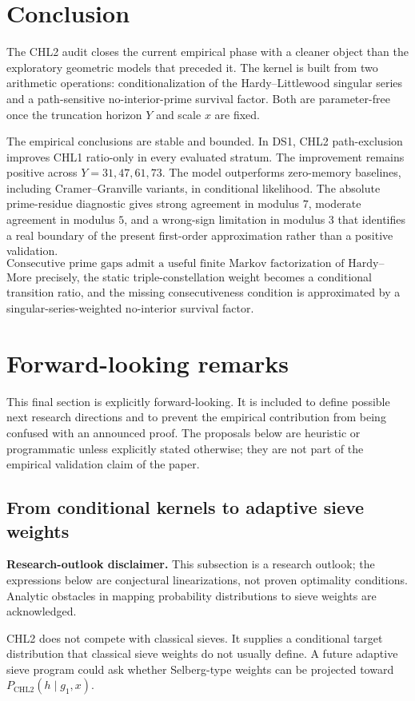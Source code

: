 \documentclass[10pt]{article}
\newcommand{\CHLtwo}{\mathrm{CHL2}}
\begin{document}
\section{Conclusion}
The CHL2 audit closes the current empirical phase with a cleaner object than the exploratory geometric models that preceded it. The kernel is built from two arithmetic operations: conditionalization of the Hardy--Littlewood singular series and a path-sensitive no-interior-prime survival factor. Both are parameter-free once the truncation horizon $Y$ and scale $x$ are fixed.

The empirical conclusions are stable and bounded. In DS1, CHL2 path-exclusion improves CHL1 ratio-only in every evaluated stratum. The improvement remains positive across $Y=31,47,61,73$. The model outperforms zero-memory baselines, including Cramer--Granville variants, in conditional likelihood. The absolute prime-residue diagnostic gives strong agreement in modulus $7$, moderate agreement in modulus $5$, and a wrong-sign limitation in modulus $3$ that identifies a real boundary of the present first-order approximation rather than a positive validation.
\[
\boxed{\text{Consecutive prime gaps admit a useful finite Markov factorization of Hardy--Littlewood structure.}}
\]
More precisely, the static triple-constellation weight becomes a conditional transition ratio, and the missing consecutiveness condition is approximated by a singular-series-weighted no-interior survival factor.
\section{Forward-looking remarks}
This final section is explicitly forward-looking. It is included to define possible next research directions and to prevent the empirical contribution from being confused with an announced proof. The proposals below are heuristic or programmatic unless explicitly stated otherwise; they are not part of the empirical validation claim of the paper.
\subsection{From conditional kernels to adaptive sieve weights}
\textbf{Research-outlook disclaimer.} This subsection is a research outlook; the expressions below are conjectural linearizations, not proven optimality conditions. Analytic obstacles in mapping probability distributions to sieve weights are acknowledged.

CHL2 does not compete with classical sieves. It supplies a conditional target distribution that classical sieve weights do not usually define. A future adaptive sieve program could ask whether Selberg-type weights can be projected toward $P_{\CHLtwo}(h\mid g_1,x)$.
\end{document}
